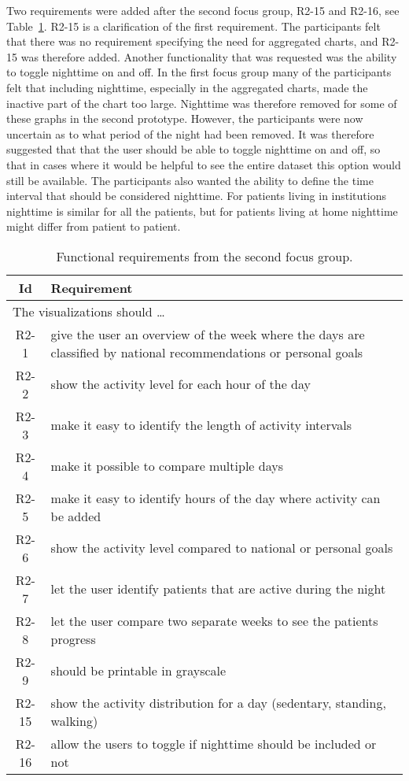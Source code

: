 Two requirements were added after the second focus group, R2-15 and R2-16, see Table~\ref{tab:f2Req}. R2-15 is a clarification of the first requirement. The participants felt that there was no requirement specifying the need for aggregated charts, and R2-15 was therefore added. Another functionality that was requested was the ability to toggle nighttime on and off. In the first focus group many of the participants felt that including nighttime, especially in the aggregated charts, made the inactive part of the chart too large. Nighttime was therefore removed for some of these graphs in the second prototype. However, the participants were now uncertain as to what period of the night had been removed. It was therefore suggested that that the user should be able to toggle nighttime on and off, so that in cases where it would be helpful to see the entire dataset this option would still be available. The participants also wanted the ability to define the time interval that should be considered  nighttime. For patients living in institutions nighttime is similar for all the patients, but for patients living at home nighttime might differ from patient to patient.

\begin{table}[h!]
  \begin{center}
  \begin{tabular}{|c|p{12cm}|}
    \hline
      \textbf{Id} & \textbf{Requirement} \\ \hline
    \multicolumn{2}{|l|}{The visualizations should \ldots} \\ \hline
      R2-1 & give the user an overview of the week where the days are classified by national recommendations or personal goals \\ \hline
      R2-2 & show the activity level for each hour of the day \\ \hline
      R2-3 & make it easy to identify the length of activity intervals \\ \hline
      R2-4 & make it possible to compare multiple days \\ \hline
      R2-5 & make it easy to identify hours of the day where activity can be added \\ \hline
      R2-6 & show the activity level compared to national or personal goals \\ \hline
      R2-7 & let the user identify patients that are active during the night \\ \hline
      R2-8 & let the user compare two separate weeks to see the patients progress \\ \hline
      R2-9 & should be printable in grayscale \\ \hline
      R2-15 & show the activity distribution for a day (sedentary, standing, walking) \\ \hline
      R2-16 & allow the users to toggle if nighttime should be included or not \\ \hline
  \end{tabular}
  \end{center}
  \caption[Functional requirements after the second focus group.]{Functional requirements from the second focus group.}
  \label{tab:f2Req}
\end{table}

